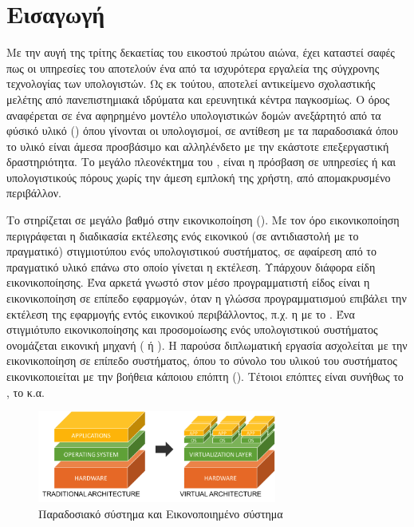 \chapter{Εισαγωγή}

Με την αυγή της τρίτης δεκαετίας του εικοστού πρώτου αιώνα, έχει καταστεί
σαφές πως οι υπηρεσίες του  αποτελούν ένα από τα
ισχυρότερα εργαλεία της σύγχρονης τεχνολογίας των υπολογιστών. Ως εκ τούτου,
αποτελεί αντικείμενο σχολαστικής μελέτης από πανεπιστημιακά ιδρύματα και
ερευνητικά κέντρα παγκοσμίως.
Ο όρος  αναφέρεται σε ένα αφηρημένο μοντέλο υπολογιστικών δομών ανεξάρτητό
από τα φύσικό υλικό () όπου γίνονται οι υπολογισμοί, σε αντίθεση με τα παραδοσιακά
 όπου το υλικό είναι άμεσα προσβάσιμο και αλληλένδετο με την εκάστοτε
επεξεργαστική δραστηριότητα.
Το μεγάλο πλεονέκτημα του ,
είναι η  πρόσβαση σε υπηρεσίες ή και υπολογιστικούς
πόρους χωρίς την άμεση εμπλοκή της χρήστη, από απομακρυσμένο περιβάλλον\cite{wikipediaCloud}.
\newline

Το  στηρίζεται σε μεγάλο βαθμό στην εικονικοποίηση ().
Με τον όρο εικονικοποίηση περιγράφεται η διαδικασία εκτέλεσης ενός εικονικού
(σε αντιδιαστολή με το πραγματικό) στιγμιοτύπου ενός υπολογιστικού συστήματος, σε
αφαίρεση από το πραγματικό υλικό επάνω στο οποίο γίνεται η εκτέλεση.
Υπάρχουν διάφορα είδη εικονικοποίησης. Ένα αρκετά γνωστό στον μέσο προγραμματιστή
είδος είναι η εικονικοποίηση σε επίπεδο εφαρμογών, όταν η γλώσσα
προγραμματισμού επιβάλει την εκτέλεση της εφαρμογής εντός εικονικού περιβάλλοντος,
π.χ. η  με το \cite{JVM}. Ένα στιγμιότυπο εικονικοποίησης και προσομοίωσης
ενός υπολογιστικού συστήματος ονομάζεται εικονική μηχανή ( ή ).
Η παρούσα διπλωματική εργασία ασχολείται με την εικονικοποίηση σε επίπεδο
συστήματος, όπου το σύνολο του υλικού του συστήματος εικονικοποιείται με την
βοήθεια κάποιου επόπτη (). Τέτοιοι επόπτες είναι συνήθως το ,
το  κ.α.
\newline
\begin{figure}[h]
  \includegraphics[width=0.7\textwidth]{pictures/generalVirtulization.png}
  \caption{Παραδοσιακό σύστημα και Εικονοποιημένο σύστημα}
  \label{fig:generalVirtulization}
\end{figure}

